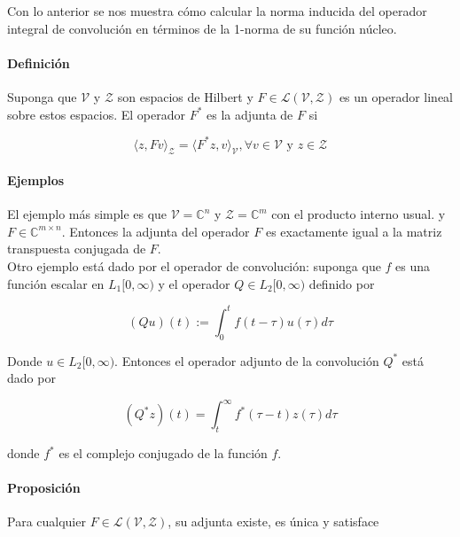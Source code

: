 Con lo anterior se nos muestra cómo calcular la norma inducida del operador integral de convolución en términos de la 1-norma de su función núcleo. \\


\paragraph{Definición} Suponga que $\mathcal{V}$ y $\mathcal{Z}$ son espacios de Hilbert y $F \in \mathcal{L}(\mathcal{V},\mathcal{Z})$ es un operador lineal sobre estos espacios. El operador $F^{*}$ es la adjunta de $F$ si

\begin{equation*}
    \langle z,Fv \rangle_{\mathcal{Z}} = \langle F^{*} z , v \rangle_{\mathcal{V}} , \forall v \in \mathcal{V} \text{ y } z \in \mathcal{Z}
\end{equation*}

\paragraph{Ejemplos}

El ejemplo más simple es que $\mathcal{V}=\mathbb{C}^n$ y $\mathcal{Z} = \mathbb{C}^m$ con el producto interno usual. y $F \in \mathbb{C}^{m \times n}$. Entonces la adjunta del operador $F$ es exactamente igual a la matriz transpuesta conjugada de $F$. \\

Otro ejemplo está dado por el operador de convolución: suponga que $f$ es una función escalar en $L_1[0,\infty)$ y el operador $Q \in L_2[0,\infty)$ definido por

\begin{equation*}
    (Q u)(t) := \int_{0}^{t} f(t- \tau)u(\tau) d \tau
\end{equation*}

Donde $u \in L_2[0,\infty)$. Entonces el operador adjunto de la convolución $Q^{*}$ está dado por

\begin{equation*}
    (Q^{*}z)(t) = \int_{t}^{\infty} f^{*}(\tau - t)z(\tau) d \tau
\end{equation*}

donde $f^{*}$ es el complejo conjugado de la función $f$.

\paragraph{Proposición} Para cualquier $F \in \mathcal{L}(\mathcal{V},\mathcal{Z})$, su adjunta existe, es única y satisface

